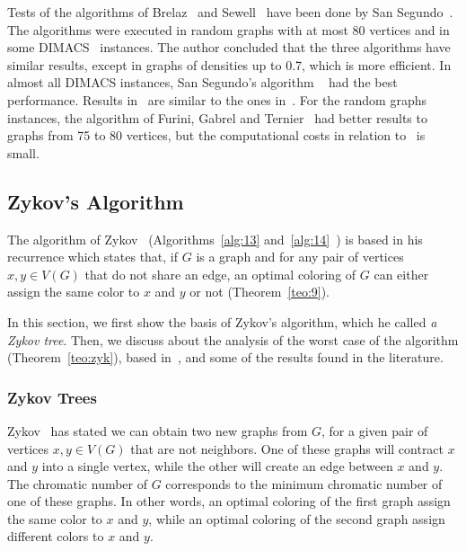 \documentclass[fleqn,10pt]{SelfArx} %
\begin{document}
	Tests of the algorithms of Brelaz~\cite{Brelaz79} and Sewell~\cite{Sewell1996} have been done by San Segundo~\cite{SanSegundo2012}. The algorithms were executed in random
	graphs with at most 80 vertices and in some DIMACS~\cite{dimacs} instances. The author
	concluded that the three algorithms have similar results, except in
	graphs of densities up to 0.7, which \cite{SanSegundo2012} is more efficient. In almost all DIMACS instances, San Segundo's algorithm ~\cite{SanSegundo2012} had the best performance.
	Results in~\cite{Furini2017} are similar to the ones in~\cite{SanSegundo2012}. For the random graphs instances, the algorithm of Furini, Gabrel and Ternier~\cite{Furini2017} had better results to graphs from 75 to 80 vertices, but the computational costs in relation to~\cite{SanSegundo2012} is small.
	
	\subsection{Zykov's Algorithm}\label{sec:zykov}
	
	The algorithm of Zykov~\cite{Zykov1952} (Algorithms~\ref{alg:13} and~\ref{alg:14}~\cite{AraujoNetoGomes2014}) is based in his recurrence
	which states that, if $G$ is a graph and for any pair of vertices $x,y \in V(G)$ that do not share an
	edge, an optimal coloring of $G$ can either assign the same color to
	$x$ and $y$ or not (Theorem~\ref{teo:9}).
	
	In this section, we first show the basis of Zykov's algorithm, which
	he called \emph{a Zykov tree}. Then, we discuss about the analysis of
	the worst case of the algorithm (Theorem~\ref{teo:zyk}), based in~\cite{AraujoNetoGomes2014}, and some of
	the results found in the literature.
	
	
	\subsubsection{Zykov Trees}
	
	Zykov~\cite{Zykov1952} has stated we can obtain two new graphs from
	$G$, for a given pair of vertices $x,y \in V(G)$ that are not neighbors. One of
	these graphs will contract $x$ and $y$ into a single vertex, while the
	other will create an edge between $x$ and $y$. The chromatic
	number of $G$ corresponds to the minimum chromatic number of one of
	these graphs. In other words, an optimal coloring of the first graph
	assign the same color to $x$ and $y$, while an optimal coloring of the
	second graph assign different colors to $x$ and $y$.
	
\end{document}
